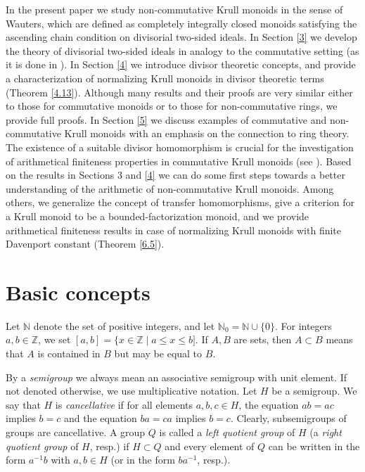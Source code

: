 \documentclass[a4paper]{amsart}
\theoremstyle{definition}
\numberwithin{equation}{section}
\begin{document}
In the present paper we study non-commutative Krull monoids in the
sense of Wauters, which are defined as completely integrally closed
monoids satisfying the ascending chain condition on
divisorial two-sided ideals. In Section \ref{3} we develop the theory of
divisorial two-sided ideals in analogy to the commutative setting (as it is
done in \cite{HK98, Ge-HK06a}). In Section \ref{4} we introduce
divisor theoretic concepts, and provide a characterization of
normalizing Krull monoids in divisor theoretic terms (Theorem
\ref{4.13}). Although many results and their proofs are very similar
either to those for commutative  monoids or to those for
non-commutative rings, we provide full proofs. In Section \ref{5} we
discuss examples of commutative and non-commutative Krull monoids
with an emphasis on the connection to ring theory. The existence of
a suitable divisor homomorphism is crucial for the investigation of
arithmetical finiteness properties in commutative Krull monoids (see
\cite[Section 3.4]{Ge-HK06a}). Based on the results in Sections {3}
and \ref{4} we can do  some first steps towards a better
understanding of the arithmetic of non-commutative Krull monoids.
Among others, we generalize the concept of  transfer homomorphisms,
give a criterion for a  Krull monoid to be a  bounded-factorization
monoid, and we provide arithmetical finiteness results in case of
normalizing Krull monoids with finite Davenport constant (Theorem
\ref{6.5}).

\bigskip
\section{Basic concepts} \label{2}
\bigskip

Let $\mathbb N$ denote the set of positive integers, and let
$\mathbb N_0 = \mathbb N \cup \{0\}$. For integers $a, b \in {\mathbb Z}$, we
set $[a, b ] = \{ x \in {\mathbb Z} \mid a \le x \le b]$. If $A, B$ are sets, then $A \subset B$ means that $A$ is contained in $B$ but may be equal to $B$.

By a {\it semigroup} we always mean an associative semigroup with
unit element. If not denoted otherwise, we  use multiplicative
notation. Let $H$ be a semigroup. We say that $H$ is {\it
cancellative} if for all elements $a, b, c \in H$, the equation $ab =
ac$ implies $b=c$ and the equation $ba = ca$ implies $b = c$.
Clearly, subsemigroups of groups are cancellative. A group $Q$ is
called a {\it left quotient group} of $H$ (a {\it right quotient
group} of $H$, resp.) if $H \subset Q$ and every element of $Q$ can
be written in the form $a^{-1}b$ with $a, b \in H$ (or in the form
$b a^{-1}$, resp.).
\end{document}
